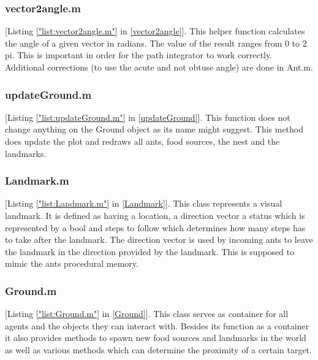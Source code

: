 \documentclass[11pt]{article}
\begin{document}
\subsubsection{vector2angle.m}
[Listing \ref{"list:vector2angle.m"} in \ref{vector2angle}]. This helper function calculates the angle of a given vector in radians. The value of the result ranges from 0 to 2 pi. This is important in order for the path integrator to work correctly. Additional corrections (to use the acute and not obtuse angle) are done in Ant.m. 


\subsubsection{updateGround.m}
[Listing \ref{"list:updateGround.m"} in \ref{updateGround}]. This function does not change anything on the Ground object as its name might suggest. This
method does update the plot and redraws all ants, food sources, the nest and the landmarks.


\subsubsection{Landmark.m}
[Listing \ref{"list:Landmark.m"} in \ref{Landmark}]. This class represents a visual landmark. It is defined as having a location, a direction vector a status which is represented by a bool and steps to follow which determines how many steps has to take after the landmark. The direction vector is used by incoming ants to leave the
landmark in the direction provided by the landmark. This is supposed to mimic the ants procedural
memory.

\subsubsection{Ground.m}
[Listing \ref{"list:Ground.m"} in \ref{Ground}]. This class serves as container for all agents and the objects they can interact with. Besides its function as a container it also provides methods to spawn new food sources and landmarks in the world as well as various methods which can determine the proximity of a certain target. 
\end{document}

